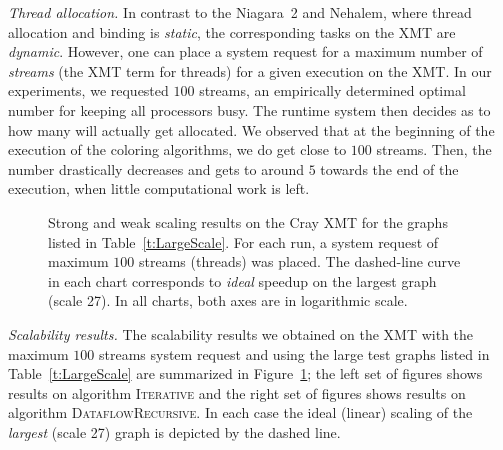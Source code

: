 \documentclass{article}
\begin{document}
{\em Thread allocation. }
In contrast to the Niagara~2 and Nehalem, where thread allocation and binding is {\em static}, 
the corresponding tasks on the XMT are {\em dynamic}. 
However, one can place a system request for a maximum number of {\em streams} 
(the XMT term for threads) for a given execution on the XMT. 
In our experiments, we requested $100$ streams,
an empirically determined optimal number for keeping all processors busy. 
The runtime system then decides as to how many will actually get allocated. 
We observed that at the beginning of the execution of the coloring algorithms, 
we do get close to $100$ streams. Then, the number drastically decreases 
and gets to around $5$ towards the end of the execution, when little computational work is left. 


\begin{figure}
\centering
{}
\caption{\small Strong and weak scaling results on the Cray XMT for the graphs 
listed in Table~\ref{t:LargeScale}. 
For each run, a system request of maximum $100$ streams (threads) was placed. 
The dashed-line curve in each chart corresponds to {\em ideal} speedup 
on the largest graph (scale 27).
In all charts, both axes are in logarithmic scale.}
\label{f:xl}
\end{figure}

{\em Scalability results. }
The scalability results we obtained on the XMT with the maximum $100$ streams system request  
and using the large test graphs listed in Table~\ref{t:LargeScale} are summarized in Figure~\ref{f:xl};
the left set of figures shows results on algorithm \textsc{\textsc{Iterative}} and the right set of figures shows
results on algorithm \textsc{DataflowRecursive}.
In each case the ideal (linear) scaling of the {\em largest} (scale 27) graph is depicted by  the dashed line.
\end{document}
